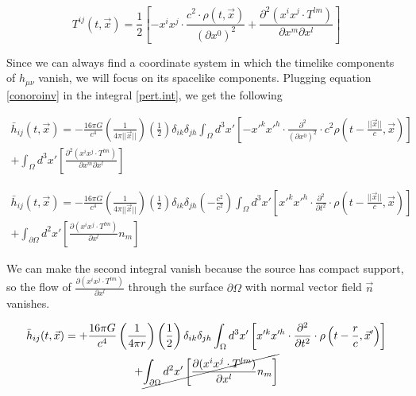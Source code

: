 \begin{equation}\label{conoroinv}
T^{ij}(t, \vec{x}) = \frac{1}{2} \left[- x^i x^j \cdot \frac{c^2 \cdot \rho(t, \vec{x})}{(\partial {x^0})^2} + \frac{\partial^2(x^i x^j \cdot T^{lm})}{\partial x^m \partial x^l} \right]
\end{equation}


Since we can always find a coordinate system in which the timelike components of $h_{\mu\nu}$ vanish, we will focus on its spacelike components. Plugging equation \ref{conoroinv} in the integral \ref{pert.int}, we get the following


\begin{equation}
\begin{gathered}
\bar{h}_{ij}(t, \vec{x}) = -\frac{16\pi G}{c^4} \left(\frac{1}{4\pi||\vec{x}||}\right) \left(\frac{1}{2} \right) \delta_{ik} \delta_{jh} \int_{\Omega} d^3x' \left[ -x'^k x'^h \cdot \frac{\partial^2}{(\partial {x^0})^2} \cdot c^2  \rho\left(t-\frac{||\vec{x}||}{c}, \vec{x}\right)\right] \\ 
+ \int_{\Omega} d^3x' \left[\frac{\partial^2(x^i x^j \cdot T^{lm})}{\partial x^m \partial x^l} \right]
\end{gathered} 
\end{equation}

\begin{equation}
\begin{gathered}
\bar{h}_{ij}(t, \vec{x}) = -\frac{16\pi G}{c^4} \left(\frac{1}{4\pi||\vec{x}||}\right) \left(\frac{1}{2} \right) \delta_{ik} \delta_{jh} \left(-\frac{c^2}{c^2}\right) \int_{\Omega} d^3x' \left[ x'^k x'^h \cdot \frac{\partial^2}{\partial t^2} \cdot  \rho\left(t-\frac{||\vec{x}||}{c}, \vec{x}\right) \right] \\+  \int_{\partial\Omega} d^2x' \left[ \frac{\partial(x^i x^j \cdot T^{lm})}{\partial x^l} n_m \right] 
\end{gathered}
\end{equation}


We can make the second integral vanish because the source has compact support, so the flow of $\frac{\partial(x^i x^j \cdot T^{lm})}{\partial x^l}$ through the surface $\partial \Omega$ with normal vector field $\vec{n}$ vanishes.

\begin{equation}
\begin{gathered}
\bar{h}_{ij}(t, \vec{x}) = +\frac{16\pi G}{c^4} \left(\frac{1}{4\pi r}\right) \left(\frac{1}{2} \right) \delta_{ik} \delta_{jh} \int_{\Omega} d^3x' \left[ x'^k x'^h \cdot \frac{\partial^2}{\partial t^2} \cdot \rho\left(t-\frac{r}{c}, \vec{x}'\right) \right] \\+ \cancel{ \int_{\partial\Omega} d^2x' \left[ \frac{\partial(x^i x^j \cdot T^{lm})}{\partial x^l} n_m \right] }
\end{gathered}
\end{equation}



